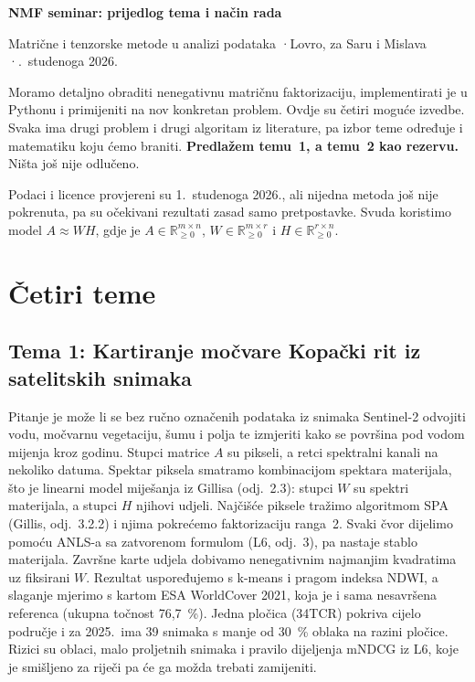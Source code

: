 \documentclass[10pt,a4paper]{article}
\newcommand{\R}{\mathbb{R}}
\begin{document}
{\sffamily\LARGE\bfseries\color{accent} NMF seminar: prijedlog tema i način rada\par}
\vspace{0.3em}
{\small\color{muted} Matrične i tenzorske metode u analizi podataka \quad·\quad Lovro, za Saru i Mislava \quad·.~studenoga 2026.\par}
\vspace{0.6em}

Moramo detaljno obraditi nenegativnu matričnu faktorizaciju, implementirati je u Pythonu i
primijeniti na nov konkretan problem. Ovdje su četiri moguće izvedbe. Svaka ima drugi problem i
drugi algoritam iz literature, pa izbor teme određuje i matematiku koju ćemo braniti.
\textbf{Predlažem temu~1, a temu~2 kao rezervu.} Ništa još nije odlučeno.

Podaci i licence provjereni su 1.~studenoga 2026., ali nijedna metoda još nije pokrenuta, pa su
očekivani rezultati zasad samo pretpostavke. Svuda koristimo model
$A\approx WH$, gdje je $A\in\R_{\geq0}^{m\times n}$, $W\in\R_{\geq0}^{m\times r}$ i
$H\in\R_{\geq0}^{r\times n}$.

\section{Četiri teme}

\subsection*{Tema 1: Kartiranje močvare Kopački rit iz satelitskih snimaka}
Pitanje je može li se bez ručno označenih podataka iz snimaka Sentinel-2 odvojiti vodu, močvarnu
vegetaciju, šumu i polja te izmjeriti kako se površina pod vodom mijenja kroz godinu.
Stupci matrice $A$ su pikseli, a retci spektralni kanali na nekoliko datuma.
Spektar piksela smatramo kombinacijom spektara materijala, što je linearni model miješanja iz
Gillisa (odj.~2.3): stupci $W$ su spektri materijala, a stupci $H$ njihovi udjeli.
Najčišće piksele tražimo algoritmom SPA (Gillis, odj.~3.2.2) i njima pokrećemo faktorizaciju ranga~2.
Svaki čvor dijelimo pomoću ANLS-a sa zatvorenom formulom (L6, odj.~3), pa nastaje stablo materijala.
Završne karte udjela dobivamo nenegativnim najmanjim kvadratima uz fiksirani $W$.
Rezultat uspoređujemo s k-means i pragom indeksa NDWI, a slaganje mjerimo s kartom ESA WorldCover 2021,
koja je i sama nesavršena referenca (ukupna točnost 76,7~\%).
Jedna pločica (34TCR) pokriva cijelo područje i za 2025.\ ima 39 snimaka s manje od 30~\% oblaka na razini pločice.
Rizici su oblaci, malo proljetnih snimaka i pravilo dijeljenja mNDCG iz L6, koje je smišljeno za
riječi pa će ga možda trebati zamijeniti.
\end{document}
